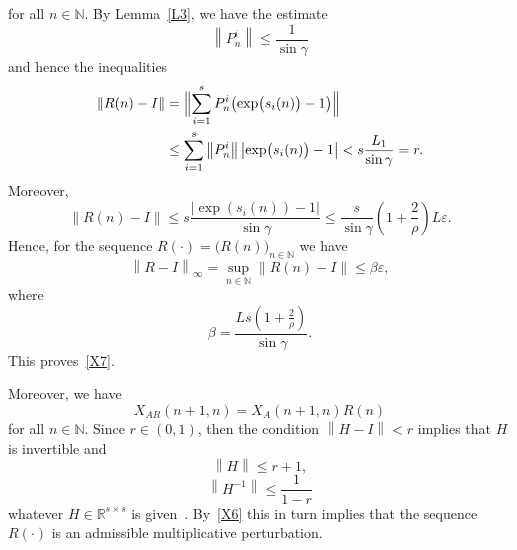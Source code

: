 \documentclass[11pt]{article}
\begin{document}
for all $n\in \mathbb{N}$. By Lemma~\ref{L3}, we have the estimate 
\begin{equation*}
\left\| P_{n}^{i}\right\| \le \frac{1}{\sin \gamma }
\end{equation*}%
and hence the inequalities 
\begin{equation}
\begin{split}
\left\| R(n)-I\right\| &=  \Bigl\|
\sum\limits_{i=1}^{s}P_{n}^{i}\bigl(\exp\bigl(s_{i}(n)\bigr)-1\bigr)\Bigr\|\\ 
&\le \sum\limits_{i=1}^{s}\left\|
P_{n}^{i}\right\| \left| \exp \bigl( s_{i}( n) \bigr)-1\right| <s\frac{L_{1}}{\sin \gamma }=r. 
\end{split}
\label{X6}
\end{equation}%
Moreover,%
\begin{equation*}
\left\| R(n)-I\right\| \le s\frac{\left| \exp ( s_i(n)) -1\right| }{\sin \gamma }\le \frac{s}{\sin \gamma }\left( 1+%
\frac{2}{\rho }\right) L\varepsilon .
\end{equation*}%
Hence, for the sequence $R(\cdot )=\bigl( R(n)\bigr)_{n\in\mathbb{N}}$ we
have%
\begin{equation*}
\left\| R-I\right\| _{\infty }=\sup_{n\in \mathbb{N}}\left\|
R(n)-I\right\| \le \beta \varepsilon ,
\end{equation*}%
where%
\begin{equation*}
\beta =\frac{Ls\left( 1+\frac{2}{\rho }\right) }{\sin \gamma }.
\end{equation*}%
This proves~\eqref{X7}.


Moreover, we have%
\begin{equation*}
X_{AR}( n+1,n) =X_{A}( n+1,n) R(n)
\end{equation*}%
for all $n\in \mathbb{N}$. Since $r\in ( 0,1) $, then the
condition $\left\| H-I\right\| <r$ implies that $H$ is invertible and%
\begin{equation*}
\left\| H\right\| \le r+1,
\end{equation*}%
\begin{equation*}
\left\| H^{-1}\right\| \le \frac{1}{1-r}
\end{equation*}%
whatever $H\in \mathbb{R}^{s\times s}$ is given~\cite[p.\,301]{HJ}. 
By~\eqref{X6} this
in turn implies that the sequence $R(\cdot )$ is an admissible
multiplicative perturbation.
\end{document}
